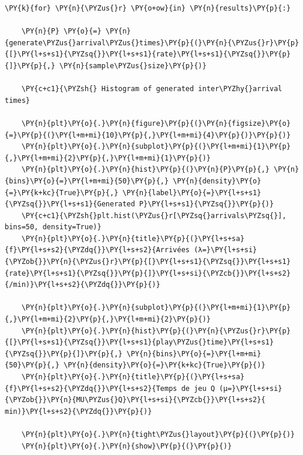     \begin{tcolorbox}[breakable, size=fbox, boxrule=1pt, pad at break*=1mm,colback=cellbackground, colframe=cellborder]
\begin{Verbatim}[commandchars=\\\{\}]
\PY{k}{for} \PY{n}{\PYZus{}r} \PY{o+ow}{in} \PY{n}{results}\PY{p}{:}

    \PY{n}{P} \PY{o}{=} \PY{n}{generate\PYZus{}arrival\PYZus{}times}\PY{p}{(}\PY{n}{\PYZus{}r}\PY{p}{[}\PY{l+s+s1}{\PYZsq{}}\PY{l+s+s1}{rate}\PY{l+s+s1}{\PYZsq{}}\PY{p}{]}\PY{p}{,} \PY{n}{sample\PYZus{}size}\PY{p}{)}

    \PY{c+c1}{\PYZsh{} Histogram of generated inter\PYZhy{}arrival times}

    \PY{n}{plt}\PY{o}{.}\PY{n}{figure}\PY{p}{(}\PY{n}{figsize}\PY{o}{=}\PY{p}{(}\PY{l+m+mi}{10}\PY{p}{,}\PY{l+m+mi}{4}\PY{p}{)}\PY{p}{)}
    \PY{n}{plt}\PY{o}{.}\PY{n}{subplot}\PY{p}{(}\PY{l+m+mi}{1}\PY{p}{,}\PY{l+m+mi}{2}\PY{p}{,}\PY{l+m+mi}{1}\PY{p}{)}
    \PY{n}{plt}\PY{o}{.}\PY{n}{hist}\PY{p}{(}\PY{n}{P}\PY{p}{,} \PY{n}{bins}\PY{o}{=}\PY{l+m+mi}{50}\PY{p}{,} \PY{n}{density}\PY{o}{=}\PY{k+kc}{True}\PY{p}{,} \PY{n}{label}\PY{o}{=}\PY{l+s+s1}{\PYZsq{}}\PY{l+s+s1}{Generated P}\PY{l+s+s1}{\PYZsq{}}\PY{p}{)}
    \PY{c+c1}{\PYZsh{}plt.hist(\PYZus{}r[\PYZsq{}arrivals\PYZsq{}], bins=50, density=True)}
    \PY{n}{plt}\PY{o}{.}\PY{n}{title}\PY{p}{(}\PY{l+s+sa}{f}\PY{l+s+s2}{\PYZdq{}}\PY{l+s+s2}{Arrivées (λ=}\PY{l+s+si}{\PYZob{}}\PY{n}{\PYZus{}r}\PY{p}{[}\PY{l+s+s1}{\PYZsq{}}\PY{l+s+s1}{rate}\PY{l+s+s1}{\PYZsq{}}\PY{p}{]}\PY{l+s+si}{\PYZcb{}}\PY{l+s+s2}{/min)}\PY{l+s+s2}{\PYZdq{}}\PY{p}{)}

    \PY{n}{plt}\PY{o}{.}\PY{n}{subplot}\PY{p}{(}\PY{l+m+mi}{1}\PY{p}{,}\PY{l+m+mi}{2}\PY{p}{,}\PY{l+m+mi}{2}\PY{p}{)}
    \PY{n}{plt}\PY{o}{.}\PY{n}{hist}\PY{p}{(}\PY{n}{\PYZus{}r}\PY{p}{[}\PY{l+s+s1}{\PYZsq{}}\PY{l+s+s1}{play\PYZus{}time}\PY{l+s+s1}{\PYZsq{}}\PY{p}{]}\PY{p}{,} \PY{n}{bins}\PY{o}{=}\PY{l+m+mi}{50}\PY{p}{,} \PY{n}{density}\PY{o}{=}\PY{k+kc}{True}\PY{p}{)}
    \PY{n}{plt}\PY{o}{.}\PY{n}{title}\PY{p}{(}\PY{l+s+sa}{f}\PY{l+s+s2}{\PYZdq{}}\PY{l+s+s2}{Temps de jeu Q (μ=}\PY{l+s+si}{\PYZob{}}\PY{n}{MU\PYZus{}Q}\PY{l+s+si}{\PYZcb{}}\PY{l+s+s2}{ min)}\PY{l+s+s2}{\PYZdq{}}\PY{p}{)}

    \PY{n}{plt}\PY{o}{.}\PY{n}{tight\PYZus{}layout}\PY{p}{(}\PY{p}{)}
    \PY{n}{plt}\PY{o}{.}\PY{n}{show}\PY{p}{(}\PY{p}{)}
\end{Verbatim}
\end{tcolorbox}

